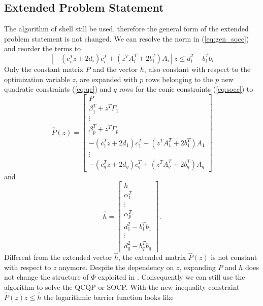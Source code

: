 \documentclass[letterpaper, 10 pt, conference]{ieeeconf}  %
\begin{document}
\subsection{Extended Problem Statement}

The algorithm of \cite{c1} shell still be used, therefore the general form of the extended problem statement is not changed. We can resolve the norm in (\ref{eq:gen_socc}) and reorder the terms to
\begin{equation}
\label{eq:socc}
  \left  [-\left( c_{i}^{T}z +2d_{i} \right )c_{i}^{T}+\left ( z^{T}A_{i}^{T}+2b_{i}^{T} \right )A_{i}  \right ]z\leq d_{i}^{2}-b_{i}^{T}b_{i}
\end{equation}
Only the constant matrix $P$ and the vector $h$, also constant with respect to the optimization variable $z$, are expanded with $p$ rows belonging to the $p$ new quadratic constraints (\ref{eq:qc}) and $q$ rows for the conic constraints (\ref{eq:socc}) to
\begin{equation*}
	\hat{P}(z)=\begin{bmatrix} P\\ \beta_{1}^{T}+z^{T}\Gamma_{1}\\ \vdots\\ \beta_{p}^{T}+z^{T}\Gamma_{p}\\
	-\left( c_{1}^{T}z +2d_{1} \right )c_{1}^{T}+\left ( z^{T}A_{1}^{T}+2b_{1}^{T} \right )A_{1}\\
	\vdots\\
	-\left( c_{q}^{T}z +2d_{q} \right )c_{q}^{T}+\left ( z^{T}A_{q}^{T}+2b_{q}^{T} \right )A_{q}
  \end{bmatrix}
\end{equation*}
and
\begin{equation*}
	\hat{h} = \begin{bmatrix} h\\ \alpha_{1}^{T}\\ \vdots\\ \alpha_{p}^{T}\\d_{1}^{2}-b_{1}^{T}b_{1}\\\vdots\\d_{q}^{2}-b_{q}^{T}b_{q}\end{bmatrix}.
\end{equation*}
Different from the extended vector $\hat{h}$, the extended matrix $\hat{P}(z)$ is not constant with respect to $z$ anymore. Despite the dependency on $z$, expanding $P$ and $h$ does not change the structure of $\Phi$ exploited in \cite{c1}. Consequently we can still use the algorithm to solve the QCQP or SOCP. With the new inequality constraint $\hat{P}(z)z \leq \hat{h}$ the logarithmic barrier function looks like
\end{document}
